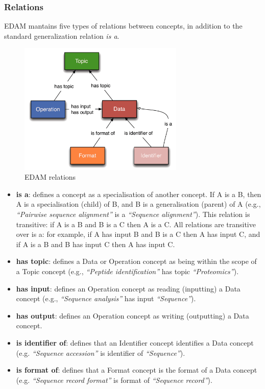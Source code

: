\documentclass{scrartcl}
\begin{document}
\subsubsection{Relations}

EDAM mantains five types of relations between concepts, 
  in addition to the standard generalization relation 
  \textit{is a}.

\begin{figure}[h!]
  \centering
  \includegraphics[width=0.7\textwidth]{imgs/EDAMrelations.png}
  \caption{EDAM relations}
  \label{fig:relations}
\end{figure}

\begin{itemize}
  \item \textbf{is a}: defines a concept as a specialisation of 
    another concept. If A is a B, then A is a specialisation (child) 
    of B, and B is a generalisation (parent) of A (e.g., 
    \textit{“Pairwise sequence alignment”} is a \textit{“Sequence alignment”}).
    This relation is transitive: if A is a B and B is a C then A is a C.
    All relations are transitive over is a: for example, if A 
    has input B and B is a C then A has input C, 
    and if A is a B and B has input C then A has input C.
  \item \textbf{has topic}: defines a Data or Operation concept as being 
    within the scope of a Topic concept (e.g., \textit{“Peptide identification”}
    has topic \textit{“Proteomics”}).
  \item \textbf{has input}: defines an Operation concept as reading (inputting) 
    a Data concept (e.g., \textit{“Sequence analysis”} has input 
    \textit{“Sequence”}).
  \item \textbf{has output}: defines an Operation concept as writing (outputting) 
    a Data concept.
  \item \textbf{is identifier of}: defines that an Identifier concept identifies 
    a Data concept (e.g. \textit{“Sequence accession”} 
    is identifier of \textit{“Sequence”}).
  \item \textbf{is format of}: defines that a Format concept is the format of a 
    Data concept (e.g. \textit{“Sequence record format”} is format 
    of \textit{“Sequence record”}).
\end{itemize}
\end{document}
